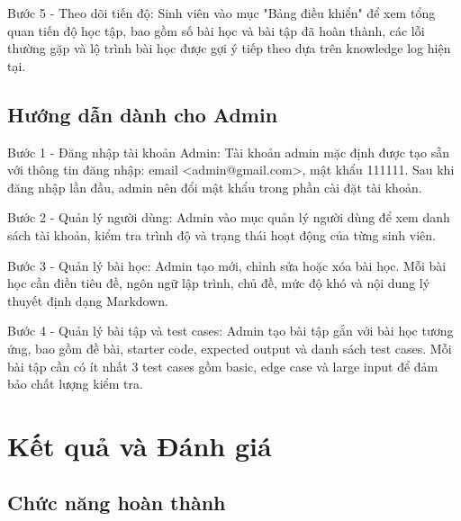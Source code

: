 \documentclass[../main.tex]{subfiles}
\begin{document}
Bước 5 - Theo dõi tiến độ: Sinh viên vào mục "Bảng điều khiển" để xem tổng quan tiến độ học tập, bao gồm số bài học và bài tập đã hoàn thành, các lỗi thường gặp và lộ trình bài học được gợi ý tiếp theo dựa trên knowledge log hiện tại.

\subsection{Hướng dẫn dành cho Admin}

Bước 1 - Đăng nhập tài khoản Admin: Tài khoản admin mặc định được tạo sẵn với thông tin đăng nhập: email <admin@gmail.com>, mật khẩu 111111. Sau khi đăng nhập lần đầu, admin nên đổi mật khẩu trong phần cài đặt tài khoản.

Bước 2 - Quản lý người dùng: Admin vào mục quản lý người dùng để xem danh sách tài khoản, kiểm tra trình độ và trạng thái hoạt động của từng sinh viên.

Bước 3 - Quản lý bài học: Admin tạo mới, chỉnh sửa hoặc xóa bài học. Mỗi bài học cần điền tiêu đề, ngôn ngữ lập trình, chủ đề, mức độ khó và nội dung lý thuyết định dạng Markdown.

Bước 4 - Quản lý bài tập và test cases: Admin tạo bài tập gắn với bài học tương ứng, bao gồm đề bài, starter code, expected output và danh sách test cases. Mỗi bài tập cần có ít nhất 3 test cases gồm basic, edge case và large input để đảm bảo chất lượng kiểm tra.

\section{Kết quả và Đánh giá}

\subsection{Chức năng hoàn thành}
\end{document}
